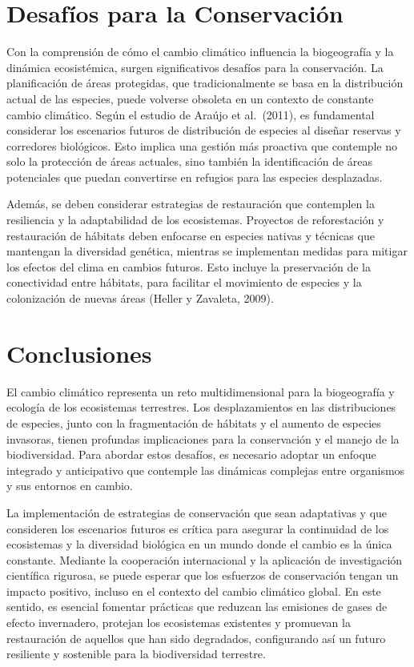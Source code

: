 \documentclass[
  letterpaper,
  DIV=11,
  numbers=noendperiod,
  oneside]{scrreprt}
\begin{document}
\section{Desafíos para la
Conservación}\label{desafuxedos-para-la-conservaciuxf3n}

Con la comprensión de cómo el cambio climático influencia la
biogeografía y la dinámica ecosistémica, surgen significativos desafíos
para la conservación. La planificación de áreas protegidas, que
tradicionalmente se basa en la distribución actual de las especies,
puede volverse obsoleta en un contexto de constante cambio climático.
Según el estudio de Araújo et al.~(2011), es fundamental considerar los
escenarios futuros de distribución de especies al diseñar reservas y
corredores biológicos. Esto implica una gestión más proactiva que
contemple no solo la protección de áreas actuales, sino también la
identificación de áreas potenciales que puedan convertirse en refugios
para las especies desplazadas.

Además, se deben considerar estrategias de restauración que contemplen
la resiliencia y la adaptabilidad de los ecosistemas. Proyectos de
reforestación y restauración de hábitats deben enfocarse en especies
nativas y técnicas que mantengan la diversidad genética, mientras se
implementan medidas para mitigar los efectos del clima en cambios
futuros. Esto incluye la preservación de la conectividad entre hábitats,
para facilitar el movimiento de especies y la colonización de nuevas
áreas (Heller y Zavaleta, 2009).

\section{Conclusiones}\label{conclusiones-3}

El cambio climático representa un reto multidimensional para la
biogeografía y ecología de los ecosistemas terrestres. Los
desplazamientos en las distribuciones de especies, junto con la
fragmentación de hábitats y el aumento de especies invasoras, tienen
profundas implicaciones para la conservación y el manejo de la
biodiversidad. Para abordar estos desafíos, es necesario adoptar un
enfoque integrado y anticipativo que contemple las dinámicas complejas
entre organismos y sus entornos en cambio.

La implementación de estrategias de conservación que sean adaptativas y
que consideren los escenarios futuros es crítica para asegurar la
continuidad de los ecosistemas y la diversidad biológica en un mundo
donde el cambio es la única constante. Mediante la cooperación
internacional y la aplicación de investigación científica rigurosa, se
puede esperar que los esfuerzos de conservación tengan un impacto
positivo, incluso en el contexto del cambio climático global. En este
sentido, es esencial fomentar prácticas que reduzcan las emisiones de
gases de efecto invernadero, protejan los ecosistemas existentes y
promuevan la restauración de aquellos que han sido degradados,
configurando así un futuro resiliente y sostenible para la biodiversidad
terrestre.
\end{document}
